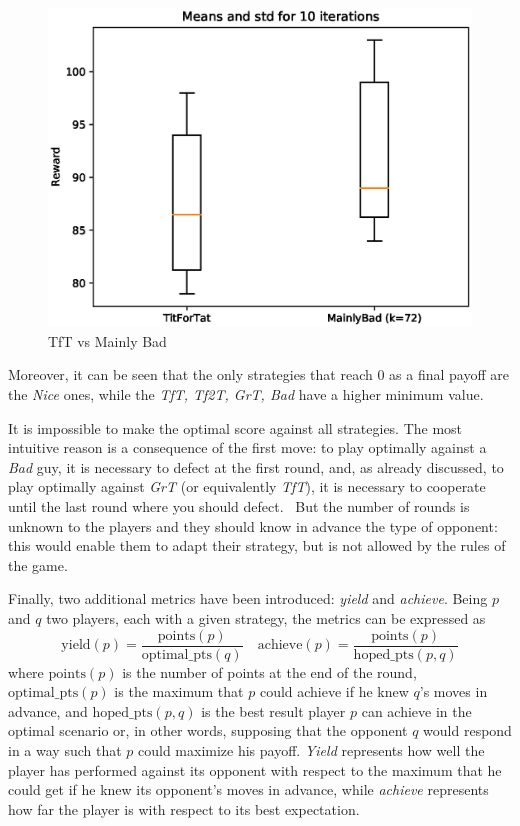 \documentclass[journal,10pt,twoside]{IEEEtran}
\begin{document}
\begin{figure}[!ht]
    \centering
    \includegraphics[width=.7\columnwidth]{../img/ipd2p/ipd2p-boxplot-TitForTat-MainlyBad(k=72)}
    \caption{TfT vs Mainly Bad}
    \label{fig:boxmbvtft}
\end{figure}

Moreover, it can be seen that the only strategies that reach 0 as a final payoff are the \textit{Nice} ones, while the \textit{TfT, Tf2T, GrT, Bad} have a higher minimum value.

It is impossible to make the optimal score against all strategies. The most intuitive reason is a consequence of the first move: to play optimally against a \textit{Bad} guy, it is necessary to defect at the first round, and, as already discussed, to play optimally against \textit{GrT} (or equivalently \textit{TfT}), it is necessary to cooperate until the last round where you should defect.~\cite{mathieu2017}
But the number of rounds is unknown to the players and they should know in advance the type of opponent: this would enable them to adapt their strategy, but is not allowed by the rules of the game. 

Finally, two additional metrics have been introduced: \textit{yield} and \textit{achieve}. 
Being $p$ and $q$ two players, each with a given strategy, the metrics can be expressed as
$$
\mathrm{yield}(p) = \frac{\mathrm{points}(p)}{\mathrm{optimal\_pts}(q)} \quad
\mathrm{achieve}(p) = \frac{\mathrm{points}(p)}{\mathrm{hoped\_pts}(p,q)}
$$
where $\mathrm{points}(p)$ is the number of points at the end of the round,
$\mathrm{optimal\_pts}(p)$ is the maximum that $p$ could achieve if he knew $q$'s moves in advance, and
$\mathrm{hoped\_pts}(p,q)$ is the best result player $p$ can achieve in the optimal scenario or, in other words, supposing that the opponent $q$ would respond in a way such that $p$ could maximize his payoff.
\textit{Yield} represents how well the player has performed against its opponent with respect to the maximum that he could get if he knew its opponent's moves in advance, while \textit{achieve} represents how far the player is with respect to its best expectation.
\end{document}

